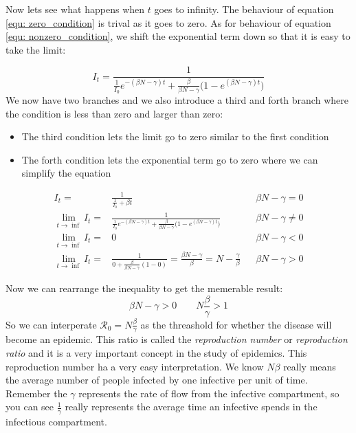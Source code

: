 \documentclass[fontsize=17pt]{article}
\begin{document}
Now lets see what happens when $t$ goes to infinity. The behaviour of equation \ref{equ: zero_condition} is trival as it goes to zero. As for behaviour of equation \ref{equ: nonzero_condition}, we shift the exponential term down so that it is easy to take the limit:

\begin{equation}
	I_{t}=\frac{1}{\frac{1}{I_{0}}e^{-(\beta N- \gamma)t}+\frac{\beta}{\beta N-\gamma}\Big(1-e^{(\beta N- \gamma)t}\Big)}
\end{equation}
We now have two branches and we also introduce a third and forth branch where the condition is less than zero and larger than zero:
\begin{itemize}
	\item The third condition lets the limit go to zero similar to the first condition
	\item The forth condition lets the exponential term go to zero where we can simplify the equation
\end{itemize}
\begin{align}
\label{equ: zero_conditionv2}I_{t}=&\frac{1}{\frac{1}{I_{0}}+\beta t}&& \beta N -\gamma=0\\
\label{equ: nonzero_conditionv2}\lim_{t \to \inf}I_{t}=&\frac{1}{\frac{1}{I_{0}}e^{-(\beta N- \gamma)t}+\frac{\beta}{\beta N-\gamma}\Big(1-e^{(\beta N- \gamma)t}\Big)}&&\beta N -\gamma \neq 0\\
\lim_{t \to \inf}I_{t}=&0&&\beta N -\gamma < 0\\
\lim_{t \to \inf}I_{t}=&\frac{1}{0+\frac{\beta}{\beta N-\gamma}(1-0)}=\frac{\beta N- \gamma}{\beta}=N-\frac{\gamma}{\beta}&&\beta N -\gamma > 0
\end{align}

Now we can rearrange the inequality to get the memerable result:
\begin{equation}
\beta N -\gamma > 0 \qquad N\frac{\beta}{\gamma}>1
\end{equation}
So we can interperate $\mathscr{R}_{0}=N\frac{\beta}{\gamma}$ as the threashold for whether the disease will become an epidemic. This ratio is called the \textit{reproduction number} or \textit{reproduction ratio} and it is a very important concept in the study of epidemics. This reproduction number ha a very easy interpretation. We know $N\beta$ really means the average number of people infected by one infective per unit of time. Remember the $\gamma$ represents the rate of flow from the infective compartment, so you can see $\frac{1}{\gamma}$ really represents the average time an infective spends in the infectious compartment.
\end{document}
